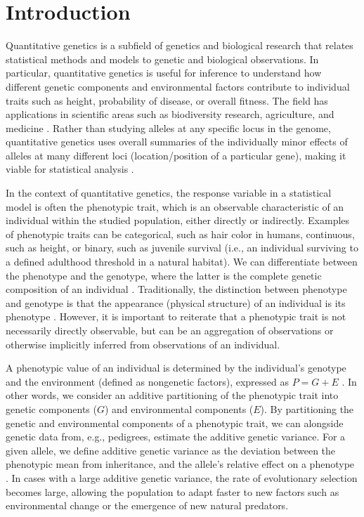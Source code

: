 \chapter{Introduction}
\label{chap:introduction}

Quantitative genetics is a subfield of genetics and biological research that relates statistical methods and models to genetic and biological observations. In particular, quantitative genetics is useful for inference to understand how different genetic components and environmental factors contribute to individual traits such as height, probability of disease, or overall fitness. The field has applications in scientific areas such as biodiversity research, agriculture, and medicine \autocite{medicine2003, agriculture2016, reid2021}. Rather than studying alleles at any specific locus in the genome, quantitative genetics uses overall summaries of the individually minor effects of alleles at many different loci (location/position of a particular gene), making it viable for statistical analysis \autocite{aase2021}. 

In the context of quantitative genetics, the response variable in a statistical model is often the phenotypic trait, which is an observable characteristic of an individual within the studied population, either directly or indirectly.  Examples of phenotypic traits can be categorical, such as hair color in humans, continuous, such as height, or binary, such as juvenile survival (i.e., an individual surviving to a defined adulthood threshold in a natural habitat).
We can differentiate between the phenotype and the genotype, where the latter is the complete genetic composition of an individual \autocite{baker2008molecular}. Traditionally, the distinction between phenotype and genotype is that the appearance (physical structure) of an individual is its phenotype \autocite{genotype-def}. However, it is important to reiterate that a phenotypic trait is not necessarily directly observable, but can be an aggregation of observations or otherwise implicitly inferred from observations of an individual.

A phenotypic value of an individual is determined by the individual's genotype and the environment (defined as nongenetic factors), expressed as $P=G+E$ \autocite{primer-ecological-genetics}. In other words, we consider an additive partitioning of the phenotypic trait into genetic components ($G$) and environmental components ($E$). By partitioning the genetic and environmental components of a phenotypic trait, we can alongside genetic data from, e.g., pedigrees, estimate the additive genetic variance. For a given allele, we define additive genetic variance as the deviation between the phenotypic mean from inheritance, and the allele's relative effect on a phenotype \autocite{vadef}. In cases with a large additive genetic variance, the rate of evolutionary selection becomes large, allowing the population to adapt faster to new factors such as environmental change or the emergence of new natural predators.

